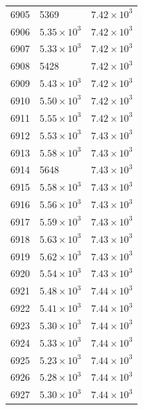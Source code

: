 \begin{table}[H]
\begin{tabular}{lll}
6905 & 5369 & $\displaystyle 7.42 \times 10^{3}$ \\
6906 & $\displaystyle 5.35 \times 10^{3}$ & $\displaystyle 7.42 \times 10^{3}$ \\
6907 & $\displaystyle 5.33 \times 10^{3}$ & $\displaystyle 7.42 \times 10^{3}$ \\
6908 & 5428 & $\displaystyle 7.42 \times 10^{3}$ \\
6909 & $\displaystyle 5.43 \times 10^{3}$ & $\displaystyle 7.42 \times 10^{3}$ \\
6910 & $\displaystyle 5.50 \times 10^{3}$ & $\displaystyle 7.42 \times 10^{3}$ \\
6911 & $\displaystyle 5.55 \times 10^{3}$ & $\displaystyle 7.42 \times 10^{3}$ \\
6912 & $\displaystyle 5.53 \times 10^{3}$ & $\displaystyle 7.43 \times 10^{3}$ \\
6913 & $\displaystyle 5.58 \times 10^{3}$ & $\displaystyle 7.43 \times 10^{3}$ \\
6914 & 5648 & $\displaystyle 7.43 \times 10^{3}$ \\
6915 & $\displaystyle 5.58 \times 10^{3}$ & $\displaystyle 7.43 \times 10^{3}$ \\
6916 & $\displaystyle 5.56 \times 10^{3}$ & $\displaystyle 7.43 \times 10^{3}$ \\
6917 & $\displaystyle 5.59 \times 10^{3}$ & $\displaystyle 7.43 \times 10^{3}$ \\
6918 & $\displaystyle 5.63 \times 10^{3}$ & $\displaystyle 7.43 \times 10^{3}$ \\
6919 & $\displaystyle 5.62 \times 10^{3}$ & $\displaystyle 7.43 \times 10^{3}$ \\
6920 & $\displaystyle 5.54 \times 10^{3}$ & $\displaystyle 7.43 \times 10^{3}$ \\
6921 & $\displaystyle 5.48 \times 10^{3}$ & $\displaystyle 7.44 \times 10^{3}$ \\
6922 & $\displaystyle 5.41 \times 10^{3}$ & $\displaystyle 7.44 \times 10^{3}$ \\
6923 & $\displaystyle 5.30 \times 10^{3}$ & $\displaystyle 7.44 \times 10^{3}$ \\
6924 & $\displaystyle 5.33 \times 10^{3}$ & $\displaystyle 7.44 \times 10^{3}$ \\
6925 & $\displaystyle 5.23 \times 10^{3}$ & $\displaystyle 7.44 \times 10^{3}$ \\
6926 & $\displaystyle 5.28 \times 10^{3}$ & $\displaystyle 7.44 \times 10^{3}$ \\
6927 & $\displaystyle 5.30 \times 10^{3}$ & $\displaystyle 7.44 \times 10^{3}$ \\

\end{tabular}
\end{table}
